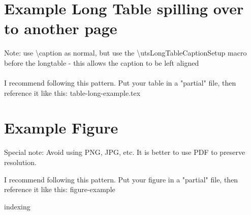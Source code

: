 \section{Example Long Table spilling over to another page}
Note: use \textbackslash{caption} as normal, but use the \textbackslash{utsLongTableCaptionSetup} macro before the longtable - this allows the caption to be left aligned\\
\\
I recommend following this pattern. Put your table in a "partial" file, then reference it like this:
{table-long-example.tex}




\section{Example Figure}
Special note: Avoid using PNG, JPG, etc. It is better to use PDF to preserve resolution.

I recommend following this pattern. Put your figure in a "partial" file, then reference it like this:
{figure-example}



{indexing}


